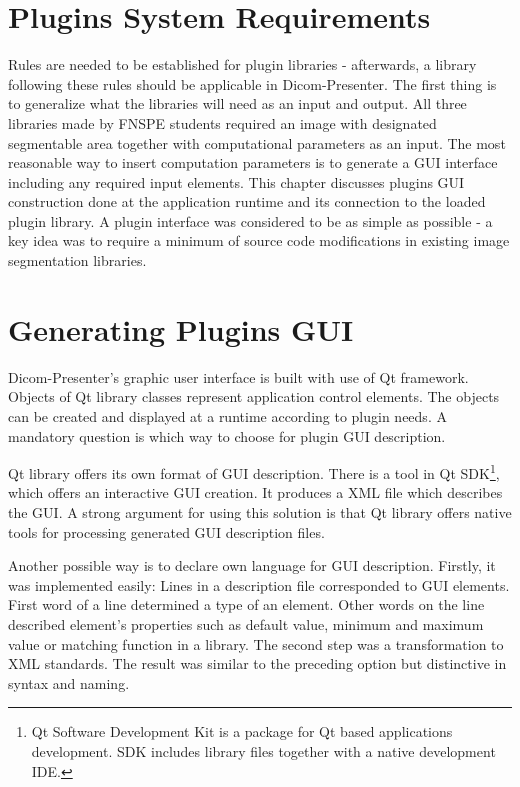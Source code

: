 \section{Plugins System Requirements}
Rules are needed to be established for plugin libraries - afterwards, a library following these rules should be applicable in Dicom-Presenter. The first thing is to generalize what the libraries will need as an input and output. All three libraries made by FNSPE students required an image with designated segmentable area together with computational parameters as an input. The most reasonable way to insert computation parameters is to generate a GUI interface including any required input elements. This chapter discusses plugins GUI construction done at the application runtime and its connection to the loaded plugin library. A plugin interface was considered to be as simple as possible - a key idea was to require a minimum of source code modifications in existing image segmentation libraries.

\section{Generating Plugins GUI}

Dicom-Presenter's graphic user interface is built with use of Qt framework. Objects of Qt library classes represent application control elements. The objects can be created and displayed at a runtime according to plugin needs. A mandatory question is which way to choose for plugin GUI description.

Qt library offers its own format of GUI description. There is a tool in Qt SDK\footnote{Qt Software Development Kit is a package for Qt based applications development. SDK includes library files together with a native development IDE.}, which offers an interactive GUI creation. It produces a XML file which describes the GUI. A strong argument for using this solution is that Qt library offers native tools for processing generated GUI description files.

Another possible way is to declare own language for GUI description. Firstly, it was implemented easily: Lines in a description file corresponded to GUI elements. First word of a line determined a type of an element. Other words on the line described element's properties such as default value, minimum and maximum value or matching function in a library. The second step was a transformation to XML standards. The result was similar to the preceding option but distinctive in syntax and naming. 

